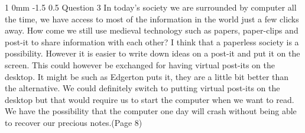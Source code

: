 \documentclass[a4paper,11pt]{article}
\makeatletter
\renewcommand{\section}{\@startsection
   {section}%
   {1}%
   {0mm}%
   {-1.5\baselineskip}%
   {0.5\baselineskip}%
   {\sffamily\bfseries\upshape\normalsize}}%
\makeatother
\begin{document}
\section{Question 3}
In today’s society we are surrounded by computer all the time, we have access to most of the information in the world just a few clicks away. How come we still use medieval technology such as papers, paper-clips and post-it to share information with each other?
\newline
\newline
I think that a paperless society is a possibility. However it is easier to write down ideas on a post-it and put it on the screen. This could however be exchanged for having virtual post-its on the desktop. It might be such as Edgerton puts it, they are a little bit better than the alternative. We could definitely switch to putting virtual post-its on the desktop but that would require us to start the computer when we want to read. We have the possibility that the computer one day will crash without being able to recover our precious notes.(Page 8)
\end{document}
